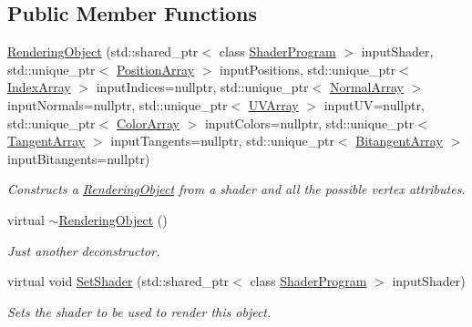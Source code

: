 \subsection*{Public Member Functions}
\begin{DoxyCompactItemize}
\item
\hyperlink{class_rendering_object_ab5e3376ea0eb6290cdc55750a420b9d1}{Rendering\+Object} (std\+::shared\+\_\+ptr$<$ class \hyperlink{class_shader_program}{Shader\+Program} $>$ input\+Shader, std\+::unique\+\_\+ptr$<$ \hyperlink{class_rendering_object_a1223b9cf03f2029b9c43d71042c2a18e}{Position\+Array} $>$ input\+Positions, std\+::unique\+\_\+ptr$<$ \hyperlink{class_rendering_object_a9931c88bca3384065c6691dfe1e60af1}{Index\+Array} $>$ input\+Indices=nullptr, std\+::unique\+\_\+ptr$<$ \hyperlink{class_rendering_object_a327c4d892de8d6138fb59afa6d078257}{Normal\+Array} $>$ input\+Normals=nullptr, std\+::unique\+\_\+ptr$<$ \hyperlink{class_rendering_object_a504ecd45ebe36dfa5b78c46d64d9904a}{U\+V\+Array} $>$ input\+UV=nullptr, std\+::unique\+\_\+ptr$<$ \hyperlink{class_rendering_object_a8a12e1f9be788d99af6c089e1c600022}{Color\+Array} $>$ input\+Colors=nullptr, std\+::unique\+\_\+ptr$<$ \hyperlink{class_rendering_object_a45b53e911c2f0131aa10e89869d38944}{Tangent\+Array} $>$ input\+Tangents=nullptr, std\+::unique\+\_\+ptr$<$ \hyperlink{class_rendering_object_a6c6bf305a5f0f9ce1006f374c753c856}{Bitangent\+Array} $>$ input\+Bitangents=nullptr)
\begin{DoxyCompactList}\small\item\em Constructs a \hyperlink{class_rendering_object}{Rendering\+Object} from a shader and all the possible vertex attributes. \end{DoxyCompactList}\item
virtual \hyperlink{class_rendering_object_ae4e8e14104ee3a587d10c9f90ec82048}{$\sim$\+Rendering\+Object} ()
\begin{DoxyCompactList}\small\item\em Just another deconstructor. \end{DoxyCompactList}\item
virtual void \hyperlink{class_rendering_object_a22311d08bb7559f6b913afe314a5031e}{Set\+Shader} (std\+::shared\+\_\+ptr$<$ class \hyperlink{class_shader_program}{Shader\+Program} $>$ input\+Shader)
\begin{DoxyCompactList}\small\item\em Sets the shader to be used to render this object. \end{DoxyCompactList}\item

\end{DoxyCompactItemize}
